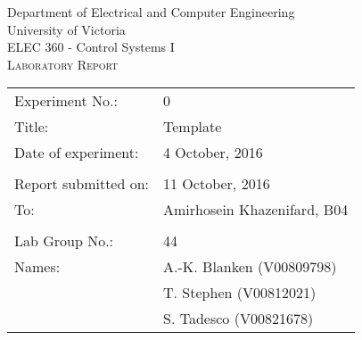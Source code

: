 \begin{titlepage}

\begin{center}
	\begin{LARGE}
		Department of Electrical and Computer Engineering \\
		University of Victoria \\
		ELEC 360 - Control Systems I \\[1cm]
		\textsc{Laboratory Report}
		\\[1cm]
	\end{LARGE}
\end{center}

\begin{tabular}{ p{} p{} }
	Experiment No.: & 0 \\ 
	Title: & Template \\ 
	Date of experiment:& 4 October, 2016 \\ 
	& \\
	Report submitted on:& 11 October, 2016 \\ 
	To: & Amirhosein Khazenifard, B04 \\ 
	& \\
  Lab Group No.: & 44 \\
	Names: & A.-K. Blanken (V00809798)\\
	& T. Stephen (V00812021) \\
  & S. Tadesco (V00821678)
\end{tabular}

\end{titlepage}
